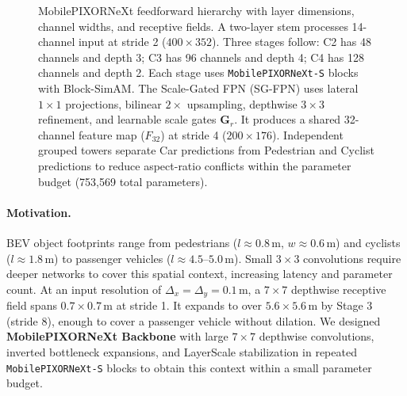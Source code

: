 \begin{figure}[t]
    \centering
    \caption{MobilePIXORNeXt feedforward hierarchy with layer dimensions, channel widths, and receptive fields. A two-layer stem processes 14-channel input at stride 2 ($400 \times 352$). Three stages follow: C2 has 48 channels and depth 3; C3 has 96 channels and depth 4; C4 has 128 channels and depth 2. Each stage uses \texttt{MobilePIXORNeXt-S} blocks with Block-SimAM. The Scale-Gated FPN (SG-FPN) uses lateral $1 \times 1$ projections, bilinear $2\times$ upsampling, depthwise $3 \times 3$ refinement, and learnable scale gates $\mathbf{G}_r$. It produces a shared 32-channel feature map ($F_{32}$) at stride 4 ($200 \times 176$). Independent grouped towers separate Car predictions from Pedestrian and Cyclist predictions to reduce aspect-ratio conflicts within the parameter budget (753,569 total parameters).}
    \label{fig:backbone}
\end{figure}


\paragraph{Motivation.}
BEV object footprints range from pedestrians ($l \approx 0.8$\,m, $w \approx 0.6$\,m) and cyclists ($l \approx 1.8$\,m) to passenger vehicles ($l \approx 4.5$--$5.0$\,m). Small $3 \times 3$ convolutions require deeper networks to cover this spatial context, increasing latency and parameter count. At an input resolution of $\Delta_x = \Delta_y = 0.1$\,m, a $7 \times 7$ depthwise receptive field spans $0.7 \times 0.7$\,m at stride 1. It expands to over $5.6 \times 5.6$\,m by Stage 3 (stride 8), enough to cover a passenger vehicle without dilation. We designed \textbf{MobilePIXORNeXt Backbone} with large $7 \times 7$ depthwise convolutions, inverted bottleneck expansions, and LayerScale stabilization in repeated \texttt{MobilePIXORNeXt-S} blocks to obtain this context within a small parameter budget.

